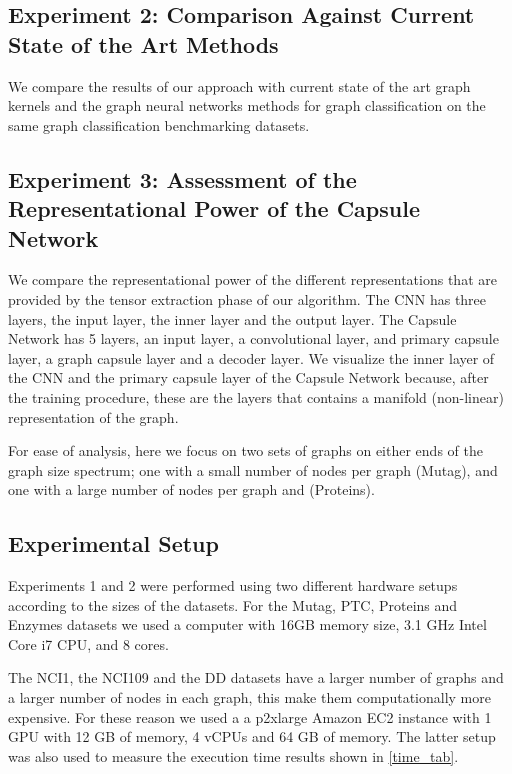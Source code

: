\documentclass[conference]{IEEEtran}
\begin{document}
\subsection{Experiment 2: Comparison Against Current State of the Art Methods}
We compare the results of our approach with current state of the art graph kernels and the graph neural networks methods for graph classification on the same graph classification benchmarking datasets.


\subsection{Experiment 3: Assessment of the Representational Power of the Capsule Network}
 
We compare the representational power of the different representations that are provided by the tensor extraction phase of our algorithm. The CNN has three layers, the input layer, the inner layer and the output layer. The Capsule Network has 5 layers, an input layer, a  convolutional layer, and primary capsule layer, a graph capsule layer and a decoder layer. We visualize the inner layer of the CNN and the primary capsule layer of the Capsule Network because, after the training procedure, these are the layers that contains a manifold (non-linear) representation of the graph.

For ease of analysis, here we focus on two sets of graphs on either ends of the graph size spectrum; one with a small number of nodes per graph (Mutag), and one with a large number of nodes per graph and (Proteins).





\subsection{Experimental Setup}
Experiments 1 and 2 were performed using two different hardware setups according to the sizes of the datasets.
For the Mutag, PTC, Proteins and Enzymes datasets we used a computer with 16GB memory size, 3.1 GHz Intel Core i7 CPU, and 8 cores.

The NCI1, the NCI109 and the DD datasets have a larger number of graphs and a larger number of nodes in each graph, this make them computationally more expensive. For these reason we used a a p2xlarge Amazon EC2 instance with 1 GPU with 12 GB of memory, 4 vCPUs and 64 GB of memory. The latter setup was also used to measure the execution time results shown in \autoref{time_tab}.
\end{document}

